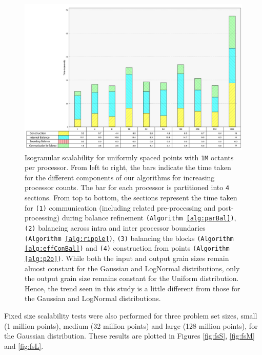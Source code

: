 \begin{figure}
  \begin{center}
    \includegraphics[width=\textwidth]{images/isoRG}
  \end{center}
  \caption{Isogranular scalability for uniformly spaced points with
  {\tt1M} octants per processor. From left to right, the bars indicate
  the time taken for the different components of our algorithms for
  increasing processor counts. The bar for each processor is
  partitioned into {\tt4} sections. From top to bottom, the sections
  represent the time taken for {\tt(1)} communication (including
  related pre-processing and post-processing) during balance
  refinement {\tt(Algorithm \ref{alg:parBal})}, {\tt(2)} balancing
  across intra and inter processor boundaries {\tt(Algorithm
  \ref{alg:ripple})}, {\tt(3)} balancing the blocks {\tt(Algorithm
  \ref{alg:effConBal})} and {\tt(4)} construction from points
  {\tt(Algorithm \ref{alg:p2o})}. While both the input and output
  grain sizes remain almost constant for the Gaussian and LogNormal
  distributions, only the output grain size remains constant for the
  Uniform distribution. Hence, the trend seen in this study is a
  little different from those for the Gaussian and LogNormal
  distributions.}
  \label{fig:isoRG}
\end{figure}

Fixed size scalability tests were also performed for three problem set
sizes, small (1 million points), medium (32 million points) and large
(128 million points), for the Gaussian distribution. These results are
plotted in Figures \ref{fig:fsS}, \ref{fig:fsM} and \ref{fig:fsL}.

